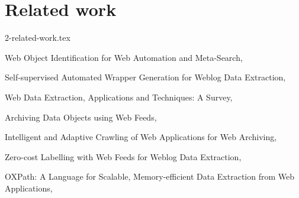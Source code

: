 \section{Related work}
2-related-work.tex

Web Object Identification for Web Automation and Meta-Search,

Self-supervised Automated Wrapper Generation for Weblog Data Extraction,

Web Data Extraction, Applications and Techniques: A Survey,

Archiving Data Objects using Web Feeds,

Intelligent and Adaptive Crawling of Web Applications for Web Archiving,

Zero-cost Labelling with Web Feeds for Weblog Data Extraction,

OXPath: A Language for Scalable, Memory-efficient Data Extraction from Web Applications,
